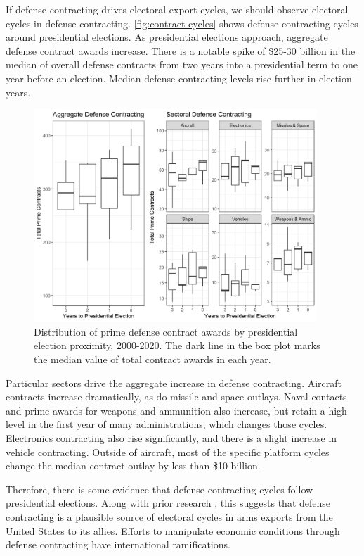 \documentclass[12pt]{article}
\begin{document}
If defense contracting drives electoral export cycles, we should observe electoral cycles in defense contracting.
\autoref{fig:contract-cycles} shows defense contracting cycles around presidential elections. 
As presidential elections approach, aggregate defense contract awards increase. 
There is a notable spike of \$25-30 billion in the median of overall defense contracts from two years into a presidential term to one year before an election. 
Median defense contracting levels rise further in election years.


\begin{figure}[htpb]
	\centering
		\includegraphics[width=0.95\textwidth]{../figures/contract-cycles.png}
	\caption{Distribution of prime defense contract awards by presidential election proximity, 2000-2020. The dark line in the box plot marks the median value of total contract awards in each year.}
	\label{fig:contract-cycles}
\end{figure}


Particular sectors drive the aggregate increase in defense contracting. 
Aircraft contracts increase dramatically, as do missile and space outlays. 
Naval contacts and prime awards for weapons and ammunition also increase, but retain a high level in the first year of many administrations, which changes those cycles. 
Electronics contracting also rise significantly, and there is a slight increase in vehicle contracting. 
Outside of aircraft, most of the specific platform cycles change the median contract outlay by less than \$10 billion.


Therefore, there is some evidence that defense contracting cycles follow presidential elections.
Along with prior research \citep{DerouenHeo2000}, this suggests that defense contracting is a plausible source of electoral cycles in arms exports from the United States to its allies.
Efforts to manipulate economic conditions through defense contracting have international ramifications. 
\end{document}
